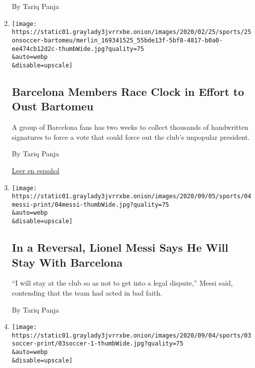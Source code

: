 \begin{enumerate}
  By Tariq Panja
\item
  \href{/2020/09/08/sports/soccer/barcelona-bartomeu.html}{}

  \texttt{[image: https://static01.graylady3jvrrxbe.onion/images/2020/02/25/sports/25onsoccer-bartomeu/merlin\_169341525\_55bde13f-5bf8-4817-b0a0-ee474cb12d2c-thumbWide.jpg?quality=75\\\&auto=webp\\\&disable=upscale]}

  \hypertarget{barcelona-members-race-clock-in-effort-to-oust-bartomeu}{%
  \subsection{Barcelona Members Race Clock in Effort to Oust
  Bartomeu}\label{barcelona-members-race-clock-in-effort-to-oust-bartomeu}}

  A group of Barcelona fans has two weeks to collect thousands of
  handwritten signatures to force a vote that could force out the club's
  unpopular president.

  By Tariq Panja

  \href{https://www.nytimes3xbfgragh.onion/es/2020/09/10/espanol/deportes/barcelona-bartomeu.html}{Leer
  en español}
\item
  \href{/2020/09/04/sports/soccer/lionel-messi-barcelona.html}{}

  \texttt{[image: https://static01.graylady3jvrrxbe.onion/images/2020/09/05/sports/04messi-print/04messi-thumbWide.jpg?quality=75\\\&auto=webp\\\&disable=upscale]}

  \hypertarget{in-a-reversal-lionel-messi-says-he-will-stay-with-barcelona}{%
  \subsection{In a Reversal, Lionel Messi Says He Will Stay With
  Barcelona}\label{in-a-reversal-lionel-messi-says-he-will-stay-with-barcelona}}

  ``I will stay at the club so as not to get into a legal dispute,''
  Messi said, contending that the team had acted in bad faith.

  By Tariq Panja
\item
  \href{/2020/09/03/sports/soccer/premier-league-china-contract-television.html}{}

  \texttt{[image: https://static01.graylady3jvrrxbe.onion/images/2020/09/04/sports/03soccer-print/03soccer-1-thumbWide.jpg?quality=75\\\&auto=webp\\\&disable=upscale]}

  \hypertarget{english-premier-league-terminates-china-tv-agreement-amid-dispute}{%
}
\end{enumerate}
